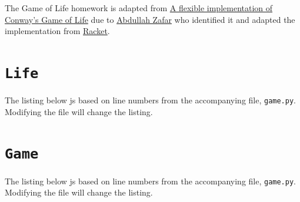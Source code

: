 \documentclass[addpoints]{exam}
\begin{document}
The Game of Life homework is adapted from \href{https://www.refsmmat.com/posts/2016-01-25-conway-game-of-life.html}{A flexible implementation of Conway's Game of Life} due to \href{https://www.facebook.com/abdullah.zafar.547389}{Abdullah Zafar} who identified it and adapted the implementation from \href{https://racket-lang.org}{Racket}.

\appendix
\section{\texttt{Life}}
The listing below js based on line numbers from the accompanying file, \texttt{game.py}. Modifying the file will change the listing.


\section{\texttt{Game}}
The listing below js based on line numbers from the accompanying file, \texttt{game.py}. Modifying the file will change the listing.


% 

% 

% 
\end{document}
